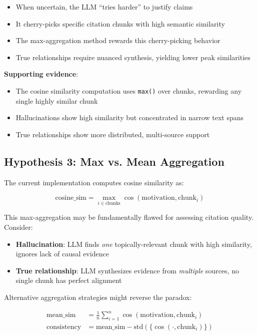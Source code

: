 \begin{itemize}
    \item When uncertain, the LLM ``tries harder'' to justify claims
    \item It cherry-picks specific citation chunks with high semantic similarity
    \item The max-aggregation method rewards this cherry-picking behavior
    \item True relationships require nuanced synthesis, yielding lower peak similarities
\end{itemize}

\textbf{Supporting evidence}:
\begin{itemize}
    \item The cosine similarity computation uses \texttt{max()} over chunks, rewarding any single highly similar chunk
    \item Hallucinations show high similarity but concentrated in narrow text spans
    \item True relationships show more distributed, multi-source support
\end{itemize}

\subsection{Hypothesis 3: Max vs. Mean Aggregation}

The current implementation computes cosine similarity as:

\begin{equation}
\text{cosine\_sim} = \max_{i \in \text{chunks}} \cos(\text{motivation}, \text{chunk}_i)
\end{equation}

This max-aggregation may be fundamentally flawed for assessing citation quality. Consider:

\begin{itemize}
    \item \textbf{Hallucination}: LLM finds \textit{one} topically-relevant chunk with high similarity, ignores lack of causal evidence
    \item \textbf{True relationship}: LLM synthesizes evidence from \textit{multiple} sources, no single chunk has perfect alignment
\end{itemize}

Alternative aggregation strategies might reverse the paradox:

\begin{align}
\text{mean\_sim} &= \frac{1}{n} \sum_{i=1}^{n} \cos(\text{motivation}, \text{chunk}_i) \\
\text{consistency} &= \text{mean\_sim} - \text{std}(\{\cos(\cdot, \text{chunk}_i)\})
\end{align}

